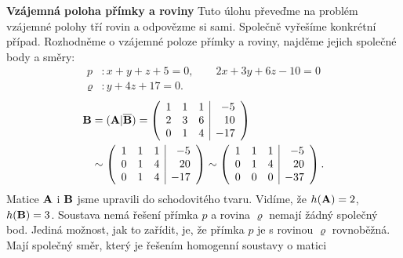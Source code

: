 \begin{mdframed}[style=mdexam]
  \begin{example}\label{mai:exam045}
    \textbf{Vzájemná poloha přímky a roviny}\newline
    Tuto úlohu převeďme na problém vzájemné polohy tří rovin a odpovězme si sami. Společně vyřešíme
    konkrétní případ. Rozhodněme o vzájemné poloze přímky a roviny, najděme jejich společné body a
    směry:
    \begin{align*}
      p       &: x + y + z + 5 = 0, \qquad 2x + 3y + 6z - 10 = 0 \\
      \varrho &: y + 4z + 17   = 0.
    \end{align*}
    \begingroup
    \renewcommand\arraystretch{1.0}
    \renewcommand\arraycolsep{3pt}
      \begin{gather*}
        \begin{align*}
        \mathbf{B} &= (\mathbf{A}\lvert\overline{\mathbf{B}}) =
        \left(
          \begin{array}{rrr|r}
            1 & 1 & 1 & -5    \\
            2 & 3 & 6 &  10   \\
            0 & 1 & 4 & -17
          \end{array}                               
        \right)                                 \\
          &\sim
        \left(
          \begin{array}{rrr|r}
            1 & 1 & 1 & -5    \\
            0 & 1 & 4 &  20   \\
            0 & 1 & 4 & -17
          \end{array}
        \right)\sim
        \left(
          \begin{array}{rrr|r}
            1 & 1 & 1 & -5    \\
            0 & 1 & 4 &  20   \\
            0 & 0 & 0 & -37
          \end{array}
        \right).
        \end{align*}
    \end{gather*}
    \endgroup
    Matice \(\mathbf{A}\) i \(\mathbf{B}\) jsme upravili do schodovitého tvaru. Vidíme, že \(h(\mathbf{A})
    = 2\), \(h(\mathbf{B}) = 3\). Soustava nemá řešení přímka \(p\) a rovina \(\varrho\) nemají žádný
    společný bod. Jediná možnost, jak to zařídit, je, že přímka \(p\) je s rovinou \(\varrho\)
    rovnoběžná. Mají společný směr, který je řešením homogenní soustavy o matici

\end{example}
\end{mdframed}
